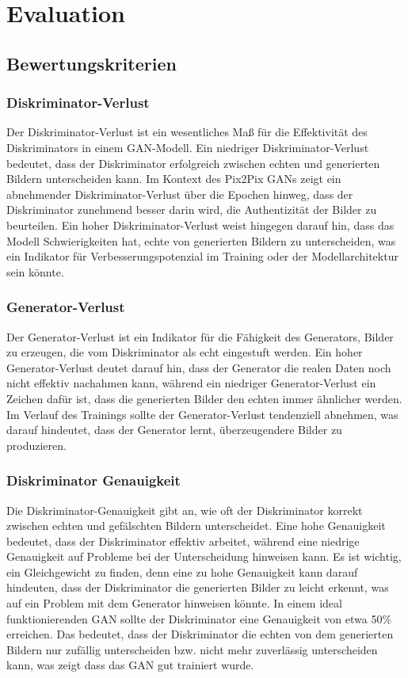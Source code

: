 \chapter{Evaluation}
\section{Bewertungskriterien}
\subsection{Diskriminator-Verlust}
Der Diskriminator-Verlust ist ein wesentliches Maß für die Effektivität des Diskriminators in einem GAN-Modell. Ein niedriger Diskriminator-Verlust bedeutet, dass der Diskriminator erfolgreich zwischen echten und generierten Bildern unterscheiden kann. Im Kontext des Pix2Pix GANs zeigt ein abnehmender Diskriminator-Verlust über die Epochen hinweg, dass der Diskriminator zunehmend besser darin wird, die Authentizität der Bilder zu beurteilen. Ein hoher Diskriminator-Verlust weist hingegen darauf hin, dass das Modell Schwierigkeiten hat, echte von generierten Bildern zu unterscheiden, was ein Indikator für Verbesserungspotenzial im Training oder der Modellarchitektur sein könnte.

\subsection{Generator-Verlust}
Der Generator-Verlust ist ein Indikator für die Fähigkeit des Generators, Bilder zu erzeugen, die vom Diskriminator als echt eingestuft werden. Ein hoher Generator-Verlust deutet darauf hin, dass der Generator die realen Daten noch nicht effektiv nachahmen kann, während ein niedriger Generator-Verlust ein Zeichen dafür ist, dass die generierten Bilder den echten immer ähnlicher werden. Im Verlauf des Trainings sollte der Generator-Verlust tendenziell abnehmen, was darauf hindeutet, dass der Generator lernt, überzeugendere Bilder zu produzieren.

\subsection{Diskriminator Genauigkeit}
Die Diskriminator-Genauigkeit gibt an, wie oft der Diskriminator korrekt zwischen echten und gefälschten Bildern unterscheidet. Eine hohe Genauigkeit bedeutet, dass der Diskriminator effektiv arbeitet, während eine niedrige Genauigkeit auf Probleme bei der Unterscheidung hinweisen kann. Es ist wichtig, ein Gleichgewicht zu finden, denn eine zu hohe Genauigkeit kann darauf hindeuten, dass der Diskriminator die generierten Bilder zu leicht erkennt, was auf ein Problem mit dem Generator hinweisen könnte.\newline
In einem ideal funktionierenden GAN sollte der Diskriminator eine Genauigkeit von etwa 50$\%$ erreichen. Das bedeutet, dass der Diskriminator die echten von dem generierten Bildern nur zufällig unterscheiden bzw. nicht mehr zuverlässig unterscheiden kann, was zeigt dass das GAN gut trainiert wurde.


